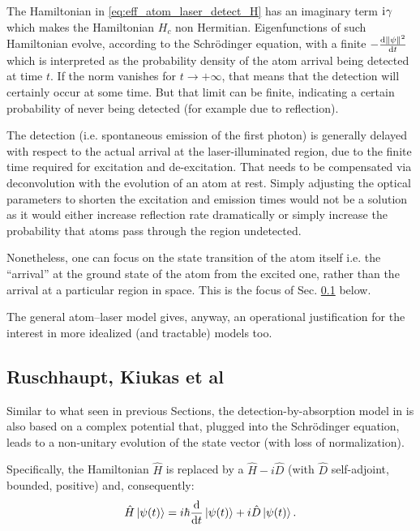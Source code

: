 The Hamiltonian in \eqref{eq:eff_atom_laser_detect_H} has an imaginary term $\mathrm{i}\mkern1mu\gamma$
which makes the Hamiltonian $H_c$ non Hermitian. Eigenfunctions of such Hamiltonian
evolve, according to the Schr\"odinger equation, with a finite 
$-\dv{\norm{\psi}^2}{t}$ which is interpreted as the probability density
of the atom arrival being detected at time $t$. If the norm vanishes for $t\rightarrow+\infty$,
that means that the detection will certainly occur at some time.
But that limit can be finite, indicating a certain probability of never being detected
(for example due to reflection).

The detection (i.e. spontaneous emission of the first photon) is generally delayed
with respect to the actual arrival at the laser-illuminated region, due to the finite time
required for excitation and de-excitation. That needs to be compensated via deconvolution
with the evolution of an atom at rest. Simply adjusting the optical parameters
to shorten the excitation and emission times
would not be a solution as it would either increase reflection rate dramatically
or simply increase the probability that atoms pass through the region undetected. 

Nonetheless, one can focus on the state transition of the atom itself i.e.
the ``arrival'' at the ground state of the atom from the excited one,
rather than the arrival at a particular region in space. This is the
focus of Sec. \ref{sec:hist:detect:kiukas} below.

The general atom--laser
model gives, anyway, an operational justification for the interest
in more idealized (and tractable) models too.

\subsection{Ruschhaupt, Kiukas et al}\label{sec:hist:detect:kiukas}

Similar to what seen in previous Sections,
the detection-by-absorption model in \cite{RuschhauptAbsorption}
is also based on a complex potential that, plugged into the Schr\"odinger equation,
leads to a non-unitary evolution of the state vector
(with loss of normalization).

Specifically, the Hamiltonian $\hat{H}$ is replaced by a $\hat{H} - i\hat{D}$
(with $\hat{D}$ self-adjoint, bounded, positive)
and, consequently:
\begin{equation}\label{eq:schrod_complex_pot}
  \hat{H} \ket{\psi(t)} = i\hbar\dv{t}\ket{\psi(t)} +i\hat{D}\ket{\psi(t)} \text{.}
\end{equation}

